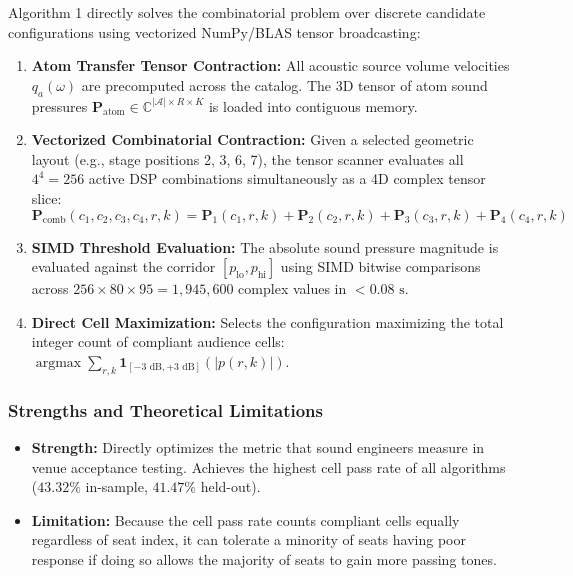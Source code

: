\documentclass[11pt,a4paper,titlepage]{article}
\begin{document}
Algorithm 1 directly solves the combinatorial problem over discrete candidate configurations using vectorized NumPy/BLAS tensor broadcasting:
\begin{enumerate}
    \item \textbf{Atom Transfer Tensor Contraction:} All acoustic source volume velocities $q_a(\omega)$ are precomputed across the catalog. The 3D tensor of atom sound pressures $\mathbf{P}_{\text{atom}} \in \mathbb{C}^{|\mathcal{A}| \times R \times K}$ is loaded into contiguous memory.
    \item \textbf{Vectorized Combinatorial Contraction:} Given a selected geometric layout (e.g., stage positions 2, 3, 6, 7), the tensor scanner evaluates all $4^4 = 256$ active DSP combinations simultaneously as a 4D complex tensor slice:
    \begin{equation}
        \mathbf{P}_{\text{comb}}(c_1, c_2, c_3, c_4, r, k) = \mathbf{P}_1(c_1, r, k) + \mathbf{P}_2(c_2, r, k) + \mathbf{P}_3(c_3, r, k) + \mathbf{P}_4(c_4, r, k)
    \end{equation}
    \item \textbf{SIMD Threshold Evaluation:} The absolute sound pressure magnitude is evaluated against the corridor $[p_{\text{lo}}, p_{\text{hi}}]$ using SIMD bitwise comparisons across $256 \times 80 \times 95 = 1,945,600$ complex values in $< 0.08\text{ s}$.
    \item \textbf{Direct Cell Maximization:} Selects the configuration maximizing the total integer count of compliant audience cells: $\operatorname{argmax} \sum_{r, k} \mathbf{1}_{[-3\text{ dB}, +3\text{ dB}]}(|p(r, k)|)$.
\end{enumerate}

\subsubsection{Strengths and Theoretical Limitations}
\begin{itemize}
    \item \textbf{Strength:} Directly optimizes the metric that sound engineers measure in venue acceptance testing. Achieves the highest cell pass rate of all algorithms ($43.32\%$ in-sample, $41.47\%$ held-out).
    \item \textbf{Limitation:} Because the cell pass rate counts compliant cells equally regardless of seat index, it can tolerate a minority of seats having poor response if doing so allows the majority of seats to gain more passing tones.
\end{itemize}
\end{document}
